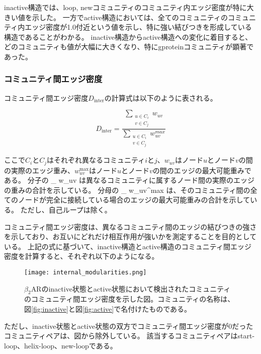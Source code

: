 inactive構造では、loop, newコミュニティのコミュニティ内エッジ密度が特に大きい値を示した。
一方でactive構造においては、全てのコミュニティのコミュニティ内エッジ密度が1.0付近という値を示し、特に強い結びつきを形成している構造であることがわかる。
inactive構造からactive構造への変化に着目すると、どのコミュニティも値が大幅に大きくなり、特にgproteinコミュニティが顕著であった。

\subsubsection{コミュニティ間エッジ密度}
コミュニティ間エッジ密度$D_{\text{inter}}$の計算式は以下のように表される。

\[
D_{\text{inter}} = \frac{\sum_{\substack{u \in C_i \\ v \in C_j}} w_{uv}}{\sum_{\substack{u \in C_i \\ v \in C_j}} w_{uv}^{max}}
\label{eq:inter_density}
\]

ここで$C_i$と$C_j$はそれぞれ異なるコミュニティ$i$と$j$、$w_{uv}$はノード$u$とノード$v$の間の実際のエッジ重み、$w_{uv}^{\text{max}}$はノード$u$とノード$v$の間のエッジの最大可能重みである。
分子の \sum_{} w_{uv} は異なるコミュニティに属するノード間の実際のエッジの重みの合計を示している。
分母の \sum_{} w_{uv}^{max} は、そのコミュニティ間の全てのノードが完全に接続している場合のエッジの最大可能重みの合計を示している。
ただし、自己ループは除く。

コミュニティ間エッジ密度は、異なるコミュニティ間のエッジの結びつきの強さを示しており、お互いにどれだけ相互作用が強いかを測定することを目的としている。
上記の式に基づいて、inactive構造とactive構造のコミュニティ間エッジ密度を計算すると、それぞれ以下のようになる。

\begin{figure}[htbp]
    \centering
    \texttt{[image: internal\_modularities.png]}
    \caption{$\beta_2$ARのinactive状態とactive状態において検出されたコミュニティのコミュニティ間エッジ密度を示した図。コミュニティの名称は、図\ref{fig:inactive}と図\ref{fig:active}で名付けたものである。}
    \label{fig:inter}
\end{figure}

\newpage

ただし、inactive状態とactive状態の双方でコミュニティ間エッジ密度が0だったコミュニティペアは、図から除外している。
該当するコミュニティペアはstart-loop、helix-loop、new-loopである。

